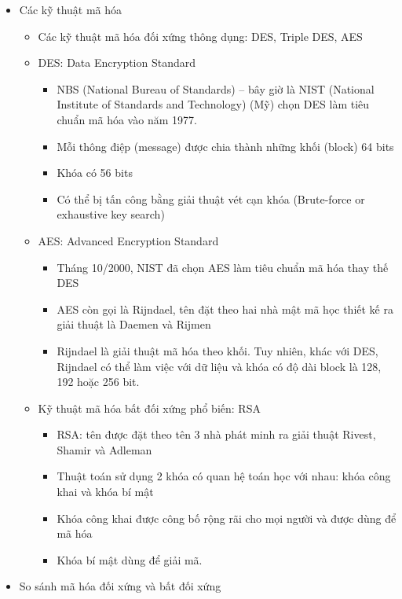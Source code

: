 \documentclass[a4paper]{article}
\begin{document}
\begin{itemize}
\begin{itemize}
\begin{itemize}
		\end{itemize}
	\item
		Các kỹ thuật mã hóa 
		\begin{itemize}
			\item
			Các kỹ thuật mã hóa đối xứng thông dụng: DES, Triple DES, AES
			\item
			DES: Data Encryption Standard
			\begin{itemize}
				\item
				NBS (National Bureau of Standards) – bây giờ là NIST (National Institute of Standards and Technology) (Mỹ) chọn DES làm tiêu chuẩn mã hóa vào năm 1977.
				\item
				Mỗi thông điệp (message) được chia thành những khối (block) 64 bits
				\item
				Khóa có 56 bits
				\item
				Có thể bị tấn công bằng giải thuật vét cạn khóa (Brute-force or
exhaustive key search)
			\end{itemize}
			\item
			AES: Advanced Encryption Standard
			\begin{itemize}
				\item
				Tháng 10/2000, NIST đã chọn AES làm tiêu chuẩn mã hóa
thay thế DES
				\item
				AES còn gọi là Rijndael, tên đặt theo hai nhà mật mã học thiết
kế ra giải thuật là Daemen và Rijmen
				\item
				Rijndael là giải thuật mã hóa theo khối. Tuy nhiên, khác với
DES, Rijndael có thể làm việc với dữ liệu và khóa có độ dài
block là 128, 192 hoặc 256 bit.
			\end{itemize}
			\item
			Kỹ thuật mã hóa bất đối xứng phổ biến: RSA
			\begin{itemize}
				\item
				RSA: tên được đặt theo tên 3 nhà phát minh ra giải thuật
Rivest, Shamir và Adleman
				\item
				Thuật toán sử dụng 2 khóa có quan hệ toán học với nhau: khóa
công khai và khóa bí mật
				\item
				Khóa công khai được công bố rộng rãi cho mọi người và được
dùng để mã hóa
				\item
				Khóa bí mật dùng để giải mã.
			\end{itemize}
		\end{itemize}
		\item
		So sánh mã hóa đối xứng và bất đối xứng
		\begin{itemize}

\end{itemize}
\end{itemize}
\end{itemize}
\end{document}
